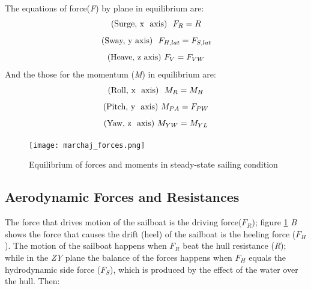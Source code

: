 The equations of force(\textit{F}) by plane in equilibrium are:
\begin{equation}\label{eq:force_x}
    \text{(Surge, x  \space axis)  \space} F_{R}=R \\
\end{equation}
\begin{equation}\label{eq:force_y}
    \text{(Sway, y\space axis) \space } \space F_{H,lat}=F_{S,lat}\\
\end{equation}
\begin{equation}\label{eq:force_z}
    \text{(Heave, z\space axis)  } \space F_{V}=F_{VW}
\end{equation}
And the those for the momentum (\textit{M}) in equilibrium are:
\begin{equation}\label{eq:m_x}
    \text{(Roll, x  \space axis) \space } M_{R}=M_{H} \\
\end{equation}
\begin{equation}\label{eq:m_y}
    \text{(Pitch, y \space axis)  } \space M_{PA}=F_{PW}\\
\end{equation}
\begin{equation}\label{eq:m_z}
    \text{(Yaw, z \space axis)  } \space M_{YW}=M_{YL}
\end{equation}

 \begin{figure}[ht]
\centering
  \texttt{[image: marchaj\_forces.png]}
 \caption{Equilibrium of forces and moments in steady-state sailing condition \cite{marchajaereo1979} }
\label{forces_m}
\end{figure}

\subsection{Aerodynamic Forces and Resistances}
The force that drives motion of the sailboat is the driving force($F_{R}$); figure \ref{forces_m} \textit{B} shows the force that causes the drift (heel) of the sailboat is the heeling force ($F_{H}$). The motion of the sailboat happens when $F_{R}$ beat the hull resistance (\textit{R}); while in the \textit{ZY} plane the balance of the forces happens when $F_{H}$ equals the hydrodynamic side force ($F_{S}$), which is produced by the effect of the water over the hull. Then:\par 

